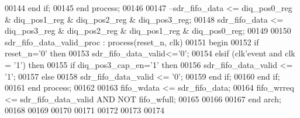 \begin{DoxyCode}
00144         \textcolor{keywordflow}{end} \textcolor{keywordflow}{if};
00145     \textcolor{keywordflow}{end} \textcolor{keywordflow}{process};
00146     
00147 \textcolor{keyword}{--sdr\_fifo\_data <= diq\_pos0\_reg & diq\_pos1\_reg & diq\_pos2\_reg & diq\_pos3\_reg;}
00148 \textcolor{vhdlchar}{sdr_fifo_data} \textcolor{vhdlchar}{<=} \textcolor{vhdlchar}{diq_pos3_reg} \textcolor{vhdlchar}{&} \textcolor{vhdlchar}{diq_pos2_reg} \textcolor{vhdlchar}{&} \textcolor{vhdlchar}{diq_pos1_reg} \textcolor{vhdlchar}{&} \textcolor{vhdlchar}{diq_pos0_reg};
00149 
00150 sdr\_fifo\_data\_valid\_proc : \textcolor{keywordflow}{process}(reset_n, clk)
00151 \textcolor{vhdlkeyword}{    begin}
00152       \textcolor{keywordflow}{if} \textcolor{vhdlchar}{reset_n}\textcolor{vhdlchar}{=}\textcolor{vhdlchar}{'}\textcolor{vhdllogic}{}\textcolor{vhdllogic}{0}\textcolor{vhdlchar}{'} \textcolor{keywordflow}{then}
00153          \textcolor{vhdlchar}{sdr_fifo_data_valid}\textcolor{vhdlchar}{<=}\textcolor{vhdlchar}{'}\textcolor{vhdllogic}{}\textcolor{vhdllogic}{0}\textcolor{vhdlchar}{'}; 
00154       \textcolor{keywordflow}{elsif} \textcolor{vhdlchar}{(}\textcolor{vhdlchar}{clk}\textcolor{vhdlchar}{'}\textcolor{vhdlkeyword}{event} \textcolor{keywordflow}{and} \textcolor{vhdlchar}{clk} \textcolor{vhdlchar}{=} \textcolor{vhdlchar}{'}\textcolor{vhdllogic}{}\textcolor{vhdllogic}{1}\textcolor{vhdlchar}{'}\textcolor{vhdlchar}{)} \textcolor{keywordflow}{then}
00155             \textcolor{keywordflow}{if} \textcolor{vhdlchar}{diq_pos3_cap_en}\textcolor{vhdlchar}{=}\textcolor{vhdlchar}{'}\textcolor{vhdllogic}{}\textcolor{vhdllogic}{1}\textcolor{vhdlchar}{'} \textcolor{keywordflow}{then} 
00156             \textcolor{vhdlchar}{sdr_fifo_data_valid} \textcolor{vhdlchar}{<=} \textcolor{vhdlchar}{'}\textcolor{vhdllogic}{}\textcolor{vhdllogic}{1}\textcolor{vhdlchar}{'};
00157             \textcolor{keywordflow}{else} 
00158                 \textcolor{vhdlchar}{sdr_fifo_data_valid} \textcolor{vhdlchar}{<=} \textcolor{vhdlchar}{'}\textcolor{vhdllogic}{}\textcolor{vhdllogic}{0}\textcolor{vhdlchar}{'};
00159             \textcolor{keywordflow}{end} \textcolor{keywordflow}{if}; 
00160         \textcolor{keywordflow}{end} \textcolor{keywordflow}{if};
00161     \textcolor{keywordflow}{end} \textcolor{keywordflow}{process};
00162     
00163 \textcolor{vhdlchar}{fifo_wdata} \textcolor{vhdlchar}{<=} \textcolor{vhdlchar}{sdr_fifo_data};
00164 \textcolor{vhdlchar}{fifo_wrreq} \textcolor{vhdlchar}{<=} \textcolor{vhdlchar}{sdr_fifo_data_valid} \textcolor{keywordflow}{AND} \textcolor{keywordflow}{NOT} \textcolor{vhdlchar}{fifo_wfull};
00165     
00166  
00167 \textcolor{keywordflow}{end} \textcolor{vhdlchar}{arch};   
00168 
00169 
00170 
00171 
00172 
00173 
00174 
\end{DoxyCode}
